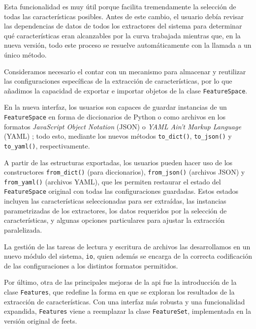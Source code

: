 \begin{description}
    Esta funcionalidad es muy útil porque facilita tremendamente la selección de todas las características posibles. Antes de este cambio, el usuario debía revisar las dependencias de datos de todos los extractores del sistema para determinar qué características eran alcanzables por la curva trabajada mientras que, en la nueva versión, todo este proceso se resuelve automáticamente con la llamada a un único método.

    \item[Persistencia de estados] Consideramos necesario el contar con un mecanismo para almacenar y reutilizar las configuraciones específicas de la extracción de características, por lo que añadimos la capacidad de exportar e importar objetos de la clase \texttt{FeatureSpace}.
    
    En la nueva interfaz, los usuarios son capaces de guardar instancias de un \texttt{FeatureSpace} en forma de diccionarios de Python o como archivos en los formatos \emph{JavaScript Object Notation} (JSON) \citep{bray2014json} o \emph{YAML Ain't Markup Language} (YAML) \citep{ben2009yaml}; todo esto, mediante los nuevos métodos \texttt{to\_dict()}, \texttt{to\_json()} y \texttt{to\_yaml()}, respectivamente. 
    
    A partir de las estructuras exportadas, los usuarios pueden hacer uso de los constructores \texttt{from\_dict()} (para diccionarios), \texttt{from\_json()} (archivos JSON) y \texttt{from\_yaml()} (archivos YAML), que les permiten restaurar el estado del \texttt{FeatureSpace} original con todas las configuraciones guardadas. Estos estados incluyen las características seleccionadas para ser extraídas, las instancias parametrizadas de los extractores, los datos requeridos por la selección de características, y algunas opciones particulares para ajustar la extracción paralelizada.
    
    La gestión de las tareas de lectura y escritura de archivos las desarrollamos en un nuevo módulo del sistema, \texttt{io}, quien además se encarga de la correcta codificación de las configuraciones a los distintos formatos permitidos.

    \item[Interfaz de características] Por último, otra de las principales mejoras de la \gls{api} fue la introducción de la clase \texttt{Features}, que redefine la forma en que se exploran los resultados de la extracción de características. Con una interfaz más robusta y una funcionalidad expandida, \texttt{Features} viene a reemplazar la clase \texttt{FeatureSet}, implementada en la versión original de \gls{feets}.


\end{description}
